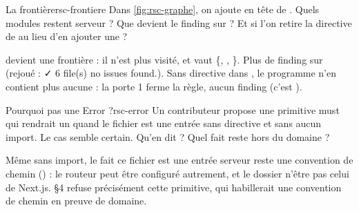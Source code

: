 \begin{exercice}{La frontière}{rsc-frontiere}
Dans \cref{fig:rsc-graphe}, on ajoute  en tête de . Quels
modules restent serveur ? Que devient le finding sur  ? Et si l'on retire la directive
de  au lieu d'en ajouter une ?
\end{exercice}
\begin{solution}
 devient une frontière : il n'est plus visité, et  vaut
\{, , \}. Plus de finding sur
 (rejoué : \og ✓ 6 file(s) no issues found.\fg{}). Sans directive dans , le programme n'en contient plus aucune : la
porte 1 ferme la règle, aucun finding (c'est ).
\end{solution}

\begin{exercice}{Pourquoi pas une Error ?}{rsc-error}
Un contributeur propose une primitive must  qui rendrait un
 quand le fichier est une entrée  sans directive et sans aucun import.
Le cas semble certain. Qu'en dit  ? Quel fait reste hors du domaine ?
\end{exercice}
\begin{solution}
Même sans import, le fait \og ce fichier est une entrée serveur\fg{} reste une convention de
chemin () : le routeur peut être configuré autrement, et le dossier
 n'être pas celui de Next.js.  §4 refuse précisément cette primitive, qui
\og habillerait une convention de chemin en preuve de domaine\fg{}.
\end{solution}
